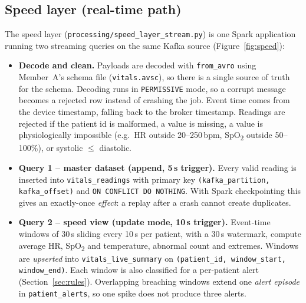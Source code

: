 \documentclass[11pt,a4paper]{article}
\newcommand{\code}[1]{\nolinkurl{#1}}
\begin{document}
\subsection{Speed layer (real-time path)}
The speed layer (\code{processing/speed_layer_stream.py}) is one Spark application running two
streaming queries on the same Kafka source (Figure~\ref{fig:speed}):

\begin{itemize}
  \item \textbf{Decode and clean.} Payloads are decoded with \code{from_avro} using Member~A's
  schema file (\code{vitals.avsc}), so there is a single source of truth for the schema. Decoding
  runs in \code{PERMISSIVE} mode, so a corrupt message becomes a rejected row instead of crashing
  the job. Event time comes from the device timestamp, falling back to the broker timestamp.
  Readings are rejected if the patient id is malformed, a value is missing, a value is
  physiologically impossible (e.g.\ HR outside 20--250\,bpm, SpO\textsubscript{2}
  outside 50--100\%), or systolic $\le$ diastolic.
  \item \textbf{Query 1 -- master dataset (append, 5\,s trigger).} Every valid reading is inserted
  into \code{vitals_readings} with primary key \code{(kafka_partition, kafka_offset)} and
  \code{ON CONFLICT DO NOTHING}. With Spark checkpointing this gives an exactly-once
  \emph{effect}: a replay after a crash cannot create duplicates.
  \item \textbf{Query 2 -- speed view (update mode, 10\,s trigger).} Event-time windows of
  30\,s sliding every 10\,s per patient, with a 30\,s watermark, compute average HR, SpO\textsubscript{2}
  and temperature, abnormal count and extremes. Windows are \emph{upserted} into
  \code{vitals_live_summary} on \code{(patient_id, window_start, window_end)}. Each window is
  also classified for a per-patient alert (Section~\ref{sec:rules}). Overlapping breaching
  windows extend one \emph{alert episode} in \code{patient_alerts}, so one spike does not
  produce three alerts.
\end{itemize}
\end{document}
